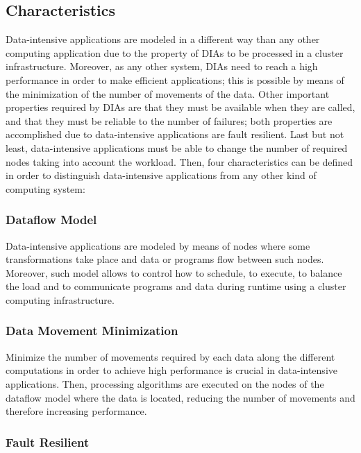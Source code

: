 \subsection{Characteristics}

Data-intensive applications are modeled in a different way than any other computing application due to the property of DIAs to be processed in a cluster infrastructure. Moreover, as any other system, DIAs need to reach a high performance in order to make efficient applications; this is possible by means of the minimization of the number of movements of the data. Other important properties required by DIAs are that they must be available when they are called, and that they must be reliable to the number of failures; both properties are accomplished due to data-intensive applications are fault resilient. Last but not least, data-intensive applications must be able to change the number of required nodes taking into account the workload. Then, four characteristics can be defined in order to distinguish data-intensive applications from any other kind of computing system:

\subsubsection*{Dataflow Model}

Data-intensive applications are modeled by means of nodes where some transformations take place and data or programs flow between such nodes. Moreover, such model allows to control how to schedule, to execute, to balance the load and to communicate programs and data during runtime using a cluster computing infrastructure.

\subsubsection*{Data Movement Minimization}

Minimize the number of movements required by each data along the different computations in order to achieve high performance is crucial in data-intensive applications. Then, processing algorithms are executed on the nodes of the dataflow model where the data is located, reducing the number of movements and therefore increasing performance.

\subsubsection*{Fault Resilient}

